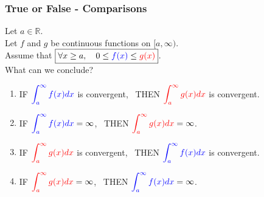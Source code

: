 \documentclass[14pt]{beamer}
\newcommand{\R}{\mathbb{R}}
\newcommand{\azul}[1]{{\color{blue} #1}}
\newcommand{\rojo}[1]{{\color{red} #1}}
\newcommand{\setsize}[1]{\fontsize{#1}{#1}\selectfont} %
\begin{document}
	\begin{frame}[t]
		\setsize{11}
		\frametitle{True or False - Comparisons}

		Let $a \in \R$. \\ Let $f$ and $g$ be continuous functions on $[a, \infty)$.
		\\ Assume that ${\displaystyle \boxed{\forall x \geq a, \quad 0 \leq \azul{f(x)} \leq \rojo{g(x)}}}$.
		\\ What can we conclude?

		\begin{enumerate}
			\item IF ${\displaystyle \azul{\int_a^{\infty} f(x) dx}}$ is convergent,
				\, THEN ${\displaystyle \rojo{\int_a^{\infty} g(x) dx}}$ is convergent.

			\item IF ${\displaystyle \azul{\int_a^{\infty} f(x) dx} = \infty}$, \,
				THEN ${\displaystyle \rojo{\int_a^{\infty} g(x) dx} = \infty}$.

			\item IF ${\displaystyle \rojo{\int_a^{\infty} g(x) dx}}$ is convergent,
				\, THEN ${\displaystyle \azul{\int_a^{\infty} f(x) dx}}$ is convergent.

			\item IF ${\displaystyle \rojo{\int_a^{\infty} g(x) dx} = \infty}$, \,
				THEN ${\displaystyle \azul{\int_a^{\infty} f(x) dx} = \infty}$.
		\end{enumerate}
	\end{frame}
\end{document}

